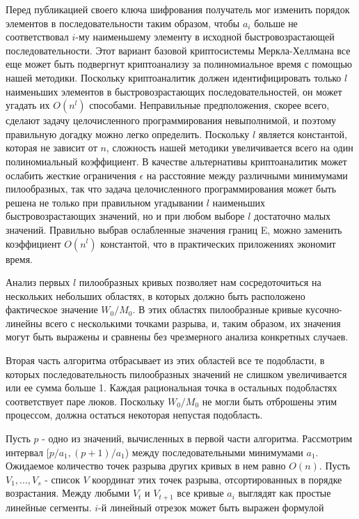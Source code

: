 \documentclass[a4paper,12pt]{report}
\begin{document}
Перед публикацией своего ключа шифрования получатель мог изменить порядок элементов в последовательности таким образом, чтобы $a_i$ больше не соответствовал $i$-му наименьшему элементу в исходной быстровозрастающей последовательности. Этот вариант базовой криптосистемы Меркла-Хеллмана все еще может быть подвергнут криптоанализу за полиномиальное время с помощью нашей методики. Поскольку криптоаналитик должен идентифицировать только $l$ наименьших элементов в быстровозрастающих последовательностей, он может угадать их $O(n^l)$ способами. Неправильные предположения, скорее всего, сделают задачу целочисленного программирования невыполнимой, и поэтому правильную догадку можно легко определить. Поскольку $l$ является константой, которая не зависит от $n$, сложность нашей методики увеличивается всего на один полиномиальный коэффициент. В качестве альтернативы криптоаналитик может ослабить жесткие ограничения $\epsilon$ на расстояние между различными минимумами пилообразных, так что задача целочисленного программирования может быть решена не только при правильном угадывании $l$ наименьших быстровозрастающих значений, но и при любом выборе $l$ достаточно малых значений. Правильно выбрав ослабленные значения границ E, можно заменить коэффициент $O(n^l)$ константой, что в практических приложениях экономит время.

Анализ первых $l$ пилообразных кривых позволяет нам сосредоточиться на нескольких небольших областях, в которых должно быть расположено фактическое значение $W_0 / M_0$. В этих областях пилообразные кривые кусочно-линейны всего с несколькими точками разрыва, и, таким образом, их значения могут быть выражены и сравнены без чрезмерного анализа конкретных случаев.

Вторая часть алгоритма отбрасывает из этих областей все те подобласти, в которых последовательность пилообразных значений не слишком увеличивается или ее сумма больше 1. Каждая рациональная точка в остальных подобластях соответствует паре люков. Поскольку $W_0 / M_0$ не могли быть отброшены этим процессом, должна остаться некоторая непустая подобласть.

Пусть $p$ - одно из значений, вычисленных в первой части алгоритма. Рассмотрим интервал [$p / a_1, (p + 1) / a_1$) между последовательными минимумами $a_1$. Ожидаемое количество точек разрыва других кривых в нем равно $O(n)$. Пусть $V_1, \ldots, V_s$ - список $V$ координат этих точек разрыва, отсортированных в порядке возрастания. Между любыми $V_t$ и $V_{t + 1}$ все кривые $a_i$ выглядят как простые линейные сегменты. $i$-й линейный отрезок может быть выражен формулой
\end{document}
